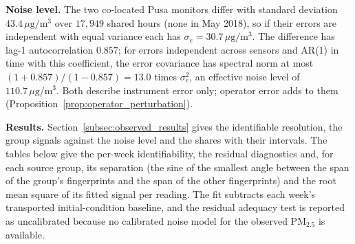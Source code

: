\noindent\textbf{Noise level.}
The two co-located Pusa monitors differ with standard deviation
\(43.4\,\mu\mathrm g/\mathrm m^3\) over \(17{,}949\) shared hours (none in May 2018), so
if their errors are independent with equal variance each has
\(\sigma_e=30.7\,\mu\mathrm g/\mathrm m^3\).  The difference has lag-1 autocorrelation
\(0.857\); for errors independent across sensors and AR(1) in time with this
coefficient, the error covariance has spectral norm at most
\((1+0.857)/(1-0.857)=13.0\) times \(\sigma_e^2\), an effective noise level of
\(110.7\,\mu\mathrm g/\mathrm m^3\).  Both describe instrument error only; operator
error adds to them (Proposition~\ref{prop:operator_perturbation}).



\noindent\textbf{Results.}
\label{subsec:results_new_delhi_identifiability}
\label{subsec:results_new_delhi_apportionment}
Section~\ref{subsec:observed_results} gives the identifiable resolution, the group
signals against the noise level and the shares with their intervals.  The tables
below give the per-week identifiability, the residual diagnostics and, for each
source group, its separation (the sine of the smallest angle between the span of the
group's fingerprints and the span of the other fingerprints) and the root mean square
of its fitted signal per reading.  The fit subtracts each week's transported
initial-condition baseline, and the residual adequacy test is reported as
uncalibrated because no calibrated noise model for the observed PM\(_{2.5}\) is
available.

